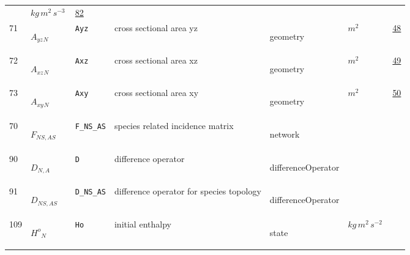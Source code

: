 \begin{longtable}{|p{1cm}|p{2.5cm}|p{4.5cm}|p{8cm}|p{3.0cm}|p{3cm}|p{1cm}|}
             & $ kg \,m^{2} \,s^{-3} \, $
             & \hyperlink{"e:82"}{ 82 }
                 \\
    71
             & \hypertarget{"v:71"}{ $ {{A_{yz}}}{_{N}} $}
             & \verb|Ayz|
             & cross sectional area yz
             & \begin{lay}geometry \end{lay}
             & $ m^{2} \, $
             & \hyperlink{"e:48"}{ 48 }
                 \\
    72
             & \hypertarget{"v:72"}{ $ {{A_{xz}}}{_{N}} $}
             & \verb|Axz|
             & cross sectional area xz
             & \begin{lay}geometry \end{lay}
             & $ m^{2} \, $
             & \hyperlink{"e:49"}{ 49 }
                 \\
    73
             & \hypertarget{"v:73"}{ $ {{A_{xy}}}{_{N}} $}
             & \verb|Axy|
             & cross sectional area xy
             & \begin{lay}geometry \end{lay}
             & $ m^{2} \, $
             & \hyperlink{"e:50"}{ 50 }
                 \\
    70
             & \hypertarget{"v:70"}{ $ {F}{_{{N S}, {A S}}} $}
             & \verb|F_NS_AS|
             & species related incidence matrix
             & \begin{lay}network \end{lay}
             & $  $
             & \\
    90
             & \hypertarget{"v:90"}{ $ {D}{_{N, A}} $}
             & \verb|D|
             & difference operator
             & \begin{lay}differenceOperator \end{lay}
             & $  $
             & \\
    91
             & \hypertarget{"v:91"}{ $ {D}{_{{N S}, {A S}}} $}
             & \verb|D_NS_AS|
             & difference operator for species topology
             & \begin{lay}differenceOperator \end{lay}
             & $  $
             & \\
    109
             & \hypertarget{"v:109"}{ $ {{H^o}}{_{N}} $}
             & \verb|Ho|
             & initial enthalpy
             & \begin{lay}state \end{lay}
             & $ kg \,m^{2} \,s^{-2} \, $

\end{longtable}
